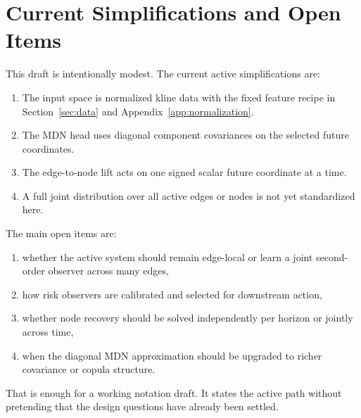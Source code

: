\section{Current Simplifications and Open Items}
\label{sec:current-simplifications-and-open-items}

This draft is intentionally modest.  The current active simplifications are:
\begin{enumerate}
  \item The input space is normalized kline data with the fixed feature recipe
  in Section~\ref{sec:data} and Appendix~\ref{app:normalization}.
  \item The MDN head uses diagonal component covariances on the selected future
  coordinates.
  \item The edge-to-node lift acts on one signed scalar future coordinate at a
  time.
  \item A full joint distribution over all active edges or nodes is not yet
  standardized here.
\end{enumerate}

The main open items are:
\begin{enumerate}
  \item whether the active system should remain edge-local or learn a joint
  second-order observer across many edges,
  \item how risk observers are calibrated and selected for downstream action,
  \item whether node recovery should be solved independently per horizon or
  jointly across time,
  \item when the diagonal MDN approximation should be upgraded to richer
  covariance or copula structure.
\end{enumerate}

That is enough for a working notation draft.  It states the active path without
pretending that the design questions have already been settled.
